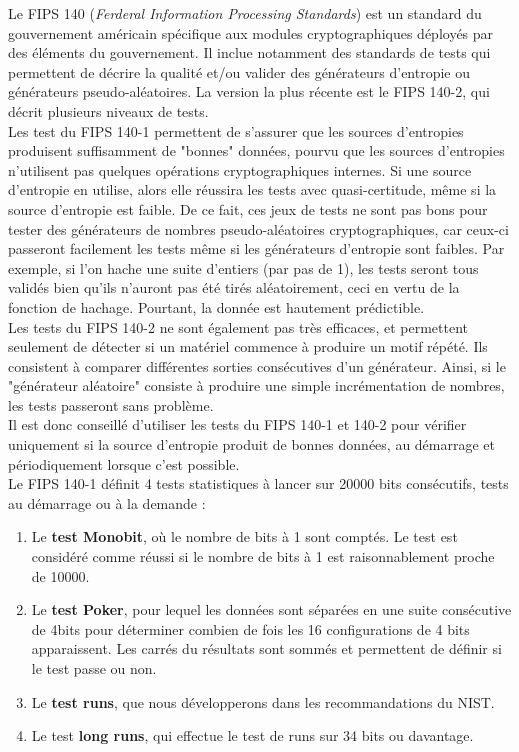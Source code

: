 		Le FIPS 140 (\textit{Ferderal Information Processing Standards}) est un standard du gouvernement américain spécifique aux modules cryptographiques déployés par des éléments du gouvernement. Il inclue notamment des standards de tests qui permettent de décrire la qualité et/ou valider des générateurs d'entropie ou générateurs pseudo-aléatoires. La version la plus récente est le FIPS 140-2, qui décrit plusieurs niveaux de tests.\\
		
		
		Les test du FIPS 140-1 permettent de s'assurer que les sources d'entropies produisent suffisamment de "bonnes" données, pourvu que les sources d'entropies n'utilisent pas quelques opérations cryptographiques internes. Si une source d'entropie en utilise, alors elle réussira les tests avec quasi-certitude, même si la source d'entropie est faible. De ce fait, ces jeux de tests ne sont pas bons pour tester des générateurs de nombres pseudo-aléatoires cryptographiques, car ceux-ci passeront facilement les tests même si les générateurs d'entropie sont faibles. Par exemple, si l'on hache une suite d'entiers (par pas de 1), les tests seront tous validés bien qu'ils n'auront pas été tirés aléatoirement, ceci en vertu de la fonction de hachage. Pourtant, la donnée est hautement prédictible.\\
		
		
		Les tests du FIPS 140-2 ne sont également pas très efficaces, et permettent seulement de détecter si un matériel commence à produire un motif répété. Ils consistent à comparer différentes sorties consécutives d'un générateur. Ainsi, si le "générateur aléatoire" consiste à produire une simple incrémentation de nombres, les tests passeront sans problème.\\
		
		
		Il est donc conseillé d'utiliser les tests du FIPS 140-1 et 140-2 pour vérifier uniquement si la source d'entropie produit de bonnes données, au démarrage et périodiquement lorsque c'est possible. \\
		
		
		
		Le FIPS 140-1 définit 4 tests statistiques à lancer sur 20000 bits consécutifs, tests au démarrage ou à la demande : 
		\begin{enumerate}
		\item Le \textbf{test Monobit}, où le nombre de bits à 1 sont comptés. Le test est considéré comme réussi si le nombre de bits à 1 est raisonnablement proche de 10000.
		\item Le \textbf{test Poker}, pour lequel les données sont séparées en une suite consécutive de 4bits pour déterminer combien de fois les 16 configurations de 4 bits apparaissent. Les carrés du résultats sont sommés et permettent de définir si le test passe ou non. 
		\item Le \textbf{test runs}, que nous développerons dans les recommandations du NIST.
		\item Le test \textbf{long runs}, qui effectue le test de runs sur 34 bits ou davantage.\\
		\end{enumerate}
		
